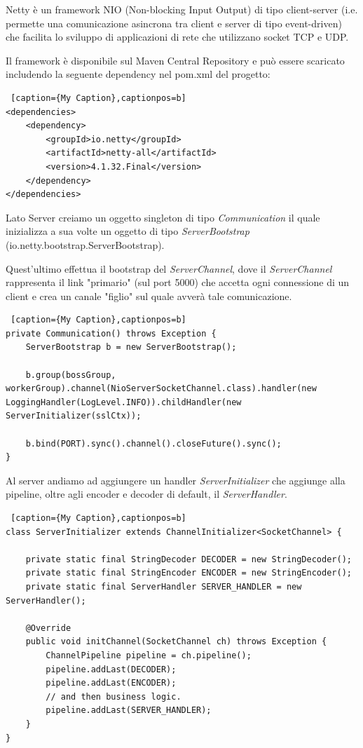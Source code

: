 Netty è un framework NIO (Non-blocking Input Output) di tipo client-server (i.e. permette una comunicazione asincrona tra client e server di tipo event-driven) che facilita lo sviluppo di applicazioni di rete che utilizzano socket TCP e UDP.

Il framework è disponibile sul Maven Central Repository e può essere scaricato includendo la seguente dependency nel pom.xml del progetto:
\begin{lstlisting} [caption={My Caption},captionpos=b]
<dependencies>
	<dependency>
		<groupId>io.netty</groupId>
		<artifactId>netty-all</artifactId>
		<version>4.1.32.Final</version>
	</dependency>
</dependencies>
\end{lstlisting}

Lato Server creiamo un oggetto singleton di tipo \textit{Communication} il quale inizializza a sua volte un oggetto di tipo \textit{ServerBootstrap} (io.netty.bootstrap.ServerBootstrap).

Quest'ultimo effettua il bootstrap del \textit{ServerChannel}, dove il \textit{ServerChannel} rappresenta il link "primario" (sul port 5000) che accetta ogni connessione di un client e crea un canale "figlio" sul quale avverà tale comunicazione.

\begin{lstlisting} [caption={My Caption},captionpos=b]
private Communication() throws Exception {
	ServerBootstrap b = new ServerBootstrap();

	b.group(bossGroup, workerGroup).channel(NioServerSocketChannel.class).handler(new LoggingHandler(LogLevel.INFO)).childHandler(new ServerInitializer(sslCtx));

	b.bind(PORT).sync().channel().closeFuture().sync();
}
\end{lstlisting}
\newpage
Al server andiamo ad aggiungere un handler \textit{ServerInitializer} che aggiunge alla pipeline, oltre agli encoder e decoder di default, il \textit{ServerHandler}.

\begin{lstlisting} [caption={My Caption},captionpos=b]
class ServerInitializer extends ChannelInitializer<SocketChannel> {

	private static final StringDecoder DECODER = new StringDecoder();
	private static final StringEncoder ENCODER = new StringEncoder();
	private static final ServerHandler SERVER_HANDLER = new ServerHandler();
	
	@Override
	public void initChannel(SocketChannel ch) throws Exception {
		ChannelPipeline pipeline = ch.pipeline();
		pipeline.addLast(DECODER);
		pipeline.addLast(ENCODER);
		// and then business logic.
		pipeline.addLast(SERVER_HANDLER);
	}
}
\end{lstlisting}

